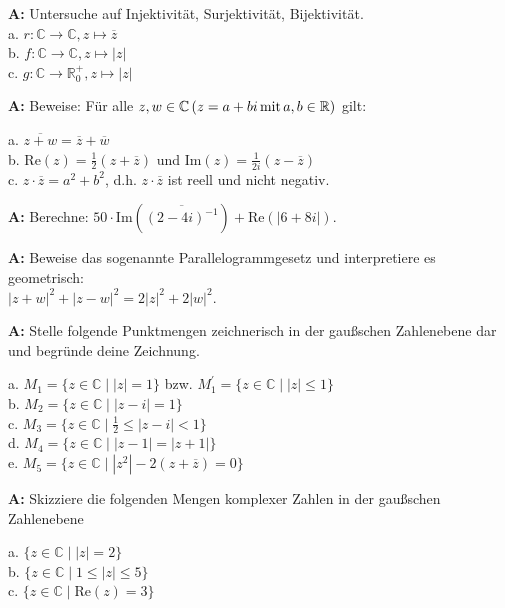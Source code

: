 \documentclass[landscape,twocolumn,a4paper]{article}
\begin{document}
\textbf{A:} Untersuche auf Injektivität, Surjektivität, Bijektivität. \\
a. $r: \mathbb{C} \rightarrow \mathbb{C}, z \mapsto \overline{z}$ \\
b. $f: \mathbb{C} \rightarrow \mathbb{C}, z \mapsto \left| z \right| $ \\
c. $g: \mathbb{C} \rightarrow \mathbb{R}_{0}^{+}, z \mapsto \left| z \right| $ 
\bigskip {}

\textbf{A:} Beweise: Für alle $z,w \in \mathbb{C} \, (z = a + b i \text{\,mit\,} a, b \in \mathbb{R})$ 
gilt: 

a. $\overline{z + w} = \overline{z} + \overline{w}$ \\
b. $\text{Re}(z) = \frac{1}{2}(z + \overline{z})$ und $\text{Im}(z) = \frac{1}{2i}(z - \overline{z})$ \\
c. $z \cdot \overline{z} = a^2 + b^2$, d.h. $z \cdot \overline{z}$ ist reell und nicht negativ.
\bigskip {}

\textbf{A:} Berechne:
$50 \cdot \text{Im}(\overline{(2-4i)^{-1}}) + \text{Re}(\left|6 + 8i \right|)$.
\bigskip {}

\textbf{A:} Beweise das sogenannte Parallelogrammgesetz und interpretiere es geometrisch: \\
$\left| z + w \right|^2 + \left| z - w \right|^2= 2 \left|z \right|^2 + 2 \left| w \right| ^2$.
\bigskip {}

\textbf{A:} Stelle folgende Punktmengen zeichnerisch in der gaußschen Zahlenebene dar und
begründe deine Zeichnung.

a. $M_1 =  \{z \in \mathbb{C} \mid  \left|z\right| = 1\}$  bzw.
  $M_1^{'} =  \{z \in \mathbb{C} \mid  \left|z\right| \le 1\}$ \\
b. $M_2 =  \{z \in \mathbb{C} \mid  \left|z - i\right| = 1\}$ \\
c. $M_3 =  \{z \in \mathbb{C} \mid  \frac{1}{2} \le \left|z - i\right| < 1\}$ \\
d. $M_4 =  \{z \in \mathbb{C} \mid  \left| z-1 \right|  = \left|z +1\right|\}$ \\
e. $M_5 =  \{z \in \mathbb{C} \mid  \left| z^2 \right| - 2(z + \overline{z})= 0\}$ 
\bigskip {}


\textbf{A:} Skizziere die folgenden Mengen komplexer Zahlen in der gaußschen Zahlenebene

a. $\{z \in \mathbb{C} \mid  \left|z\right| = 2\}$ \\
b.  $\{z \in \mathbb{C} \mid 1 \le \left|z\right| \le  5\}$ \\
c.  $\{z \in \mathbb{C} \mid  \text{Re}(z) = 3 \}$ 
\bigskip {}
 
\end{document}
